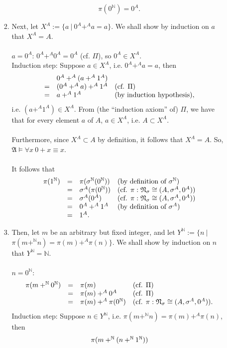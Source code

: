 \begin{enumerate}[1.]
\begin{enumerate}[(a)]
\begin{enumerate}[1)]
\[
\pi(0^\mathbb{N}) = 0^A.
\]
\item Next, let $X^A := \{ a \ | \ 0^A +^A a = a \}$. We shall show by induction on $a$ that $X^A = A$.\\
\\
$a = 0^A$: $0^A +^A 0^A = 0^A$ (cf. $\Pi$), so $0^A \in X^A$.\\
Induction step: Suppose $a \in X^A$, i.e. $0^A +^A a = a$, then
\[
\begin{array}{lll}
\ & 0^A +^A (a +^A 1^A) & \ \cr
= & (0^A +^A a) +^A 1^A & \mbox{(cf. $\Pi$)} \cr
= & a +^A 1^A & \mbox{(by induction hypothesis)}, \cr
\end{array}
\]
i.e. $(a +^A 1^A) \in X^A$. From (the ``induction axiom'' of) $\Pi$, we have that for every element $a$ of $A$, $a \in X^A$, i.e. $A \subset X^A$.\\
\\
Furthermore, since $X^A \subset A$ by definition, it follows that $X^A = A$. So, $\mathfrak{A} \models \forall x \ 0 + x \equiv x$.\\
\\
It follows that
\[
\begin{array}{llll}
\pi(1^\mathbb{N}) & = & \pi(\sigma^\mathbb{N}(0^\mathbb{N})) & \mbox{(by definition of $\sigma^\mathbb{N}$)} \cr
\ & = & \sigma^A(\pi(0^\mathbb{N})) & \mbox{(cf. $\pi: \mathfrak{N}_\sigma \cong (A, \sigma^A, 0^A)$)} \cr
\ & = & \sigma^A(0^A) & \mbox{(cf. $\pi: \mathfrak{N}_\sigma \cong (A, \sigma^A, 0^A)$)} \cr
\ & = & 0^A +^A 1^A & \mbox{(by definition of $\sigma^A$)} \cr
\ & = & 1^A.
\end{array}
\]
\item Then, let $m$ be an arbitrary but fixed integer, and let $Y^\mathbb{N} := \{ n \ |$\\$\pi(m +^\mathbb{N} n) = \pi(m) +^A \pi(n) \}$. We shall show by induction on $n$ that $Y^\mathbb{N} = \mathbb{N}$.\\
\\
$n = 0^\mathbb{N}$:
\[
\begin{array}{llll}
\pi(m +^\mathbb{N} 0^\mathbb{N}) & = & \pi(m) & \mbox{(cf. $\Pi$)} \cr
\ & = & \pi(m) +^A 0^A & \mbox{(cf. $\Pi$)} \cr
\ & = & \pi(m) +^A \pi(0^\mathbb{N}) & \mbox{(cf. $\pi: \mathfrak{N}_\sigma \cong (A, \sigma^A, 0^A)$)}.
\end{array}
\]
Induction step: Suppose $n \in Y^\mathbb{N}$, i.e. $\pi(m +^\mathbb{N} n) = \pi(m) +^A \pi(n)$, then
\[
\begin{array}{lll}
\ & \pi(m +^\mathbb{N} (n +^\mathbb{N} 1^\mathbb{N})) & \ \cr

\end{array}\]
\end{enumerate}
\end{enumerate}
\end{enumerate}
